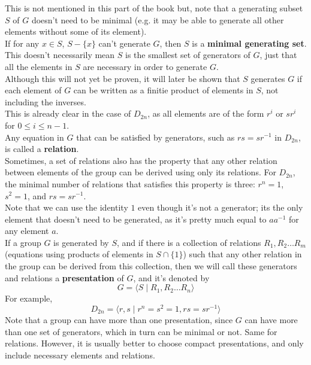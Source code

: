 \documentclass[12pt]{article}
\begin{document}
    This is not mentioned in this part of the book but,
    note that a generating subset $S$ of $G$ doesn't need to be minimal
    (e.g. it may be able to generate all other elements without some of
    its element). \\
    If for any $x \in S$, $S - \{x\}$ can't generate $G$,
    then $S$ is a \textbf{minimal generating set}.
    This doesn't necessarily mean $S$ is the smallest set of generators
    of $G$,
    just that all the elements in $S$ are necessary
    in order to generate $G$. \\
    
    Although this will not yet be proven,
    it will later be shown that $S$ generates $G$
    if each element of $G$
    can be written as a finitie product of elements in $S$,
    not including the inverses. \\
    This is already clear in the case of $D_{2n}$,
    as all elements are of the form $r^i$ or $sr^{i}$
    for $0 \leqslant i \leqslant n-1$. \\

    Any equation in $G$ that can be satisfied by generators,
    such as $rs = sr^{-1}$ in $D_{2n}$,
    is called a \textbf{relation}. \\
    Sometimes, a set of relations also has the property that 
    any other relation between elements of the group can be derived
    using only its relations.
    For $D_{2n}$, the minimal number of relations that satisfies
    this property is three:
    $r^n = 1$, $s^2 = 1$, and $rs = sr^{-1}$. \\
    Note that we can use the identity $1$ even though it's not a generator;
    its the only element that doesn't need to be generated,
    as it's pretty much equal to $aa^{-1}$ for any element $a$. \\

    If a group $G$ is generated by $S$,
    and if there is a collection of relations $R_1, R_2 \dots R_m$
    (equations using products of elements in $S \cap \{1\}$)
    such that any other relation in the group can be derived
    from this collection, 
    then we will call these generators and relations
    a \textbf{presentation} of $G$,
    and it's denoted by
    \[ G = \langle S \mid R_1, R_2 \dots R_n \rangle \]
    For example,
    \[ D_{2n} = \langle r, s \mid r^n = s^2 = 1, rs = sr^{-1} \rangle \]
    Note that a group can have more than one presentation,
    since $G$ can have more than one set of generators,
    which in turn can be minimal or not.
    Same for relations.
    However, it is usually better to choose compact presentations,
    and only include necessary elements and relations. \\

    


    
\end{document}
